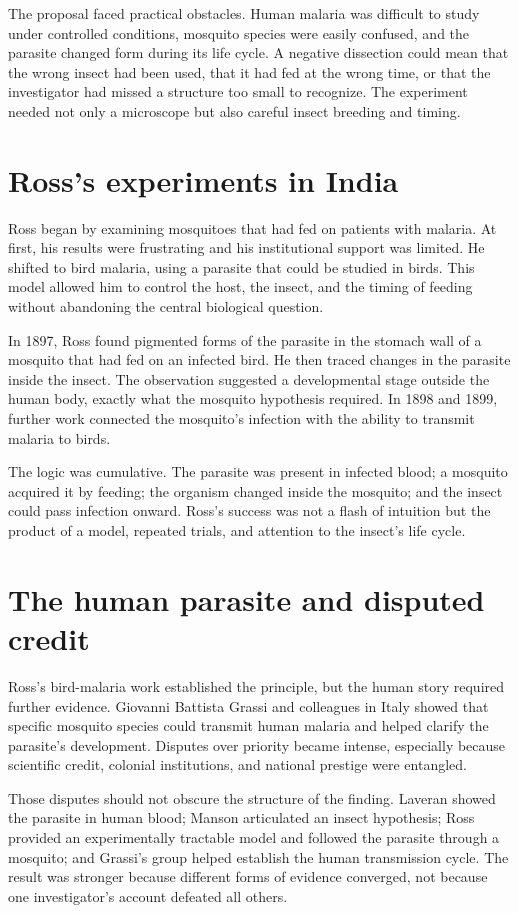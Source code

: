 \documentclass[12pt,oneside]{book}
\begin{document}
The proposal faced practical obstacles. Human malaria was difficult to study
under controlled conditions, mosquito species were easily confused, and the
parasite changed form during its life cycle. A negative dissection could mean
that the wrong insect had been used, that it had fed at the wrong time, or that
the investigator had missed a structure too small to recognize. The experiment
needed not only a microscope but also careful insect breeding and timing.

\section{Ross's experiments in India}
Ross began by examining mosquitoes that had fed on patients with malaria. At
first, his results were frustrating and his institutional support was limited.
He shifted to bird malaria, using a parasite that could be studied in birds.
This model allowed him to control the host, the insect, and the timing of
feeding without abandoning the central biological question.

In 1897, Ross found pigmented forms of the parasite in the stomach wall of a
mosquito that had fed on an infected bird. He then traced changes in the
parasite inside the insect. The observation suggested a developmental stage
outside the human body, exactly what the mosquito hypothesis required. In 1898
and 1899, further work connected the mosquito's infection with the ability to
transmit malaria to birds.

The logic was cumulative. The parasite was present in infected blood; a
mosquito acquired it by feeding; the organism changed inside the mosquito; and
the insect could pass infection onward. Ross's success was not a flash of
intuition but the product of a model, repeated trials, and attention to the
insect's life cycle.

\section{The human parasite and disputed credit}
Ross's bird-malaria work established the principle, but the human story required
further evidence. Giovanni Battista Grassi and colleagues in Italy showed that
specific mosquito species could transmit human malaria and helped clarify the
parasite's development. Disputes over priority became intense, especially
because scientific credit, colonial institutions, and national prestige were
entangled.

Those disputes should not obscure the structure of the finding. Laveran showed
the parasite in human blood; Manson articulated an insect hypothesis; Ross
provided an experimentally tractable model and followed the parasite through a
mosquito; and Grassi's group helped establish the human transmission cycle.
The result was stronger because different forms of evidence converged, not
because one investigator's account defeated all others.
\end{document}
